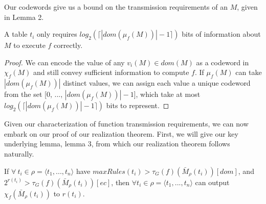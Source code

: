 Our codewords give us a bound on the transmission requirements of an $M$, given in Lemma 2.

\begin{lemma} 
\label{lemma:codewords}
A table $t_i$ only requires $log_2(\lceil |dom(\mu_f(M))|-1 \rceil)$ bits of information about $M$ to execute $f$ correctly.
\end{lemma}

\begin{proof}
We can encode the value of any $v_i(M) \in dom(M)$ as a codeword in $\chi_f(M)$ and still convey sufficient information to compute $f$. If $\mu_f(M)$ can take $|dom(\mu_f(M))|$ distinct values, we can assign each value a unique codeword from the set [$0$, $...$, $|dom(\mu_f(M))|-1$], which take at most $log_2(\lceil |dom(\mu_f(M))|-1 \rceil)$ bits to represent.
\end{proof}

 Given our characterization of function transmission requirements, we can now embark on our proof of our realization theorem. First, we will give our key underlying lemma, lemma 3, from which our realization theorem follows naturally.

\begin{lemma} 
\label{lemma:core-lemma}
If $\forall\ t_i \in \rho = \langle t_1, ..., t_n \rangle$ have $maxRules(t_i) > \tau_G(f)(\bar{M}_\rho(t_i))[dom]$, and $2^{r(t_i)} > \tau_G(f)(\bar{M}_\rho(t_i))[ec]$, then $\forall t_i \in \rho = \langle t_1, ..., t_n \rangle$ can output $\chi_f(\bar{M}_\rho(t_i))$ to $r(t_i)$.
\end{lemma}

